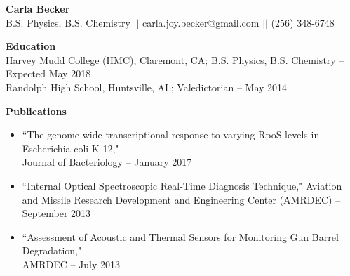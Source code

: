 \documentclass[9pt]{article}
\begin{document}
{\centering \Large \bf Carla Becker \\}
{\centering B.S. Physics, B.S. Chemistry $\vert \vert$ carla.joy.becker@gmail.com $\vert \vert$ (256) 348-6748 \\}

\noindent
{\bf Education \\}
Harvey Mudd College (HMC), Claremont, CA; B.S. Physics, B.S. Chemistry \--- Expected May 2018 \\
Randolph High School, Huntsville, AL; Valedictorian \--- May 2014 
\vspace{3mm}

\linespread{1}

\iffalse
\noindent
{\bf Objective \\}
To find a summer internship at the Jet Propulsion Laboratory (JPL) for 2017 in an area related to any of the following: condensed matter physics, nanoelectronics, optoelectronics, micro/nano electromechanical systems (MEMs/NEMs), or computational fluid dynamics.
\vspace{3mm}
\fi

\noindent
{\bf Publications \\}
\vspace{-8mm}
\begin{itemize}[leftmargin=3.75mm]
	\setlength{\itemsep}{0pt}
    \setlength{\parskip}{0pt}
    \setlength{\parsep}{0pt}
\item``The genome-wide transcriptional response to varying RpoS levels in Escherichia coli K-12," \\ Journal of Bacteriology \--- January 2017
\item ``Internal Optical Spectroscopic Real-Time Diagnosis Technique,"  Aviation and Missile Research Development and Engineering Center (AMRDEC) \--- September 2013
\item ``Assessment of Acoustic and Thermal Sensors for Monitoring Gun Barrel Degradation," \\ AMRDEC \--- July 2013
\end{itemize}
\end{document}
